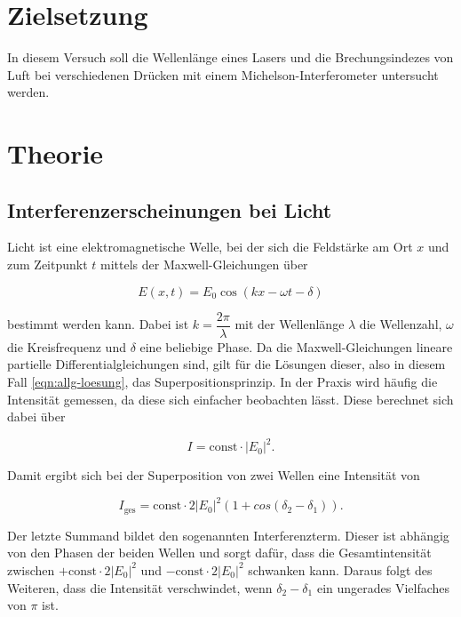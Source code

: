 \section{Zielsetzung}

In diesem Versuch soll die Wellenlänge eines Lasers und die Brechungsindezes von Luft bei verschiedenen Drücken mit einem Michelson-Interferometer untersucht werden.

\section{Theorie}
\label{sec:Theorie}

\subsection{Interferenzerscheinungen bei Licht}

Licht ist eine elektromagnetische Welle, bei der sich die Feldstärke am Ort $x$ und zum Zeitpunkt $t$ mittels der Maxwell-Gleichungen über

\begin{equation}
    \label{eqn:allg-loesung}
    E(x,t) = E_0 \cos(kx - \omega t - \delta)
\end{equation}

bestimmt werden kann. Dabei ist $k = \dfrac{2\pi}{\lambda}$ mit der Wellenlänge $\lambda$ die Wellenzahl, $\omega$ die Kreisfrequenz und $\delta$ eine beliebige Phase.
Da die Maxwell-Gleichungen lineare partielle Differentialgleichungen sind, gilt für die Lösungen dieser, also in diesem Fall \eqref{eqn:allg-loesung}, das Superpositionsprinzip.
In der Praxis wird häufig die Intensität gemessen, da diese sich einfacher beobachten lässt. Diese berechnet sich dabei über

\begin{equation}
    \label{eqn:intensitaet}
    I = \text{const} \cdot |E_0|^2.
\end{equation}

Damit ergibt sich bei der Superposition von zwei Wellen eine Intensität von

\begin{equation}
    I_\text{ges} = \text{const} \cdot 2 |E_0|^2 (1 + cos(\delta_2 - \delta_1)).
\end{equation}

Der letzte Summand bildet den sogenannten Interferenzterm. Dieser ist abhängig von den Phasen der beiden Wellen und sorgt dafür, dass die Gesamtintensität zwischen $+ \text{const} \cdot 2 |E_0|^2$ und $- \text{const} \cdot 2 |E_0|^2$ schwanken kann.
Daraus folgt des Weiteren, dass die Intensität verschwindet, wenn $\delta_2 - \delta_1$ ein ungerades Vielfaches von $\pi$ ist.

